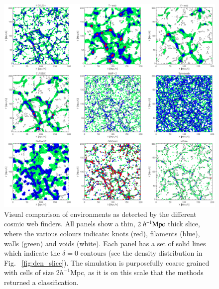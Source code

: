 \documentclass[useAMS,usenatbib]{mnras}
\def\hmpc{~h^{-1}\rm Mpc}
\begin{document}
\begin{figure}
 \includegraphics[width=\textwidth]{./FIGS/fig1v4a.eps}
 \vspace{-.4cm}
 \caption{Visual comparison of environments as detected by the different cosmic web finders. All panels show a thin, $2\hmpc$ thick slice, where the various colours indicate: knots (red), filaments (blue), walls (green) and voids (white). Each panel has a set of solid lines which indicate the $\delta=0$ contours (see the density distribution in Fig.~ \ref{fig:den_slice}). The simulation is purposefully coarse grained with cells of size 2$h^{-1}$Mpc, as it is on this scale that the methods returned a classification.}
 \label{fig:env_slice_a}
\end{figure}
\end{document}

